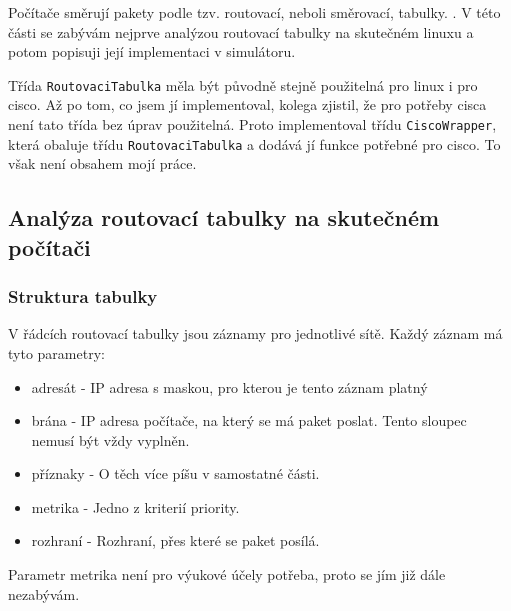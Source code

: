 
Počítače směrují pakety podle tzv. routovací, neboli směrovací, tabulky. \cite{owebu:routovaci_tabulka}. V této části se zabývám nejprve analýzou routovací tabulky na skutečném linuxu a potom popisuji její implementaci v simulátoru.

Třída \verb|RoutovaciTabulka| měla být původně stejně použitelná pro linux i pro cisco. Až po tom, co jsem jí implementoval, kolega zjistil, že pro potřeby cisca není tato třída bez úprav použitelná. Proto implementoval třídu \verb|CiscoWrapper|, která obaluje třídu \verb|RoutovaciTabulka| a dodává jí funkce potřebné pro cisco. To však není obsahem mojí práce.


\subsection{Analýza routovací tabulky na skutečném počítači}

\subsubsection{Struktura tabulky}

V řádcích routovací tabulky jsou záznamy pro jednotlivé sítě. Každý záznam má tyto parametry:
\begin{itemize}
\item adresát - IP adresa s maskou, pro kterou je tento záznam platný
\item brána - IP adresa počítače, na který se má paket poslat. Tento sloupec nemusí být vždy vyplněn.
\item příznaky - O těch více píšu v samostatné části.
\item metrika - Jedno z kriterií priority.
\item rozhraní - Rozhraní, přes které se paket posílá.
\end{itemize}
Parametr metrika není pro výukové účely potřeba, proto se jím již dále nezabývám.

